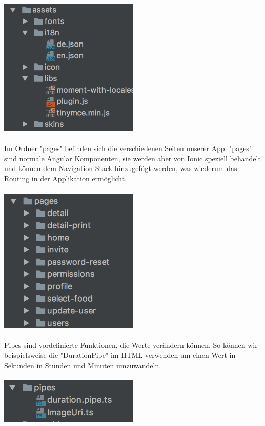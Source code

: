 \documentclass[11pt]{article} %
\begin{document}
\\
\includegraphics[width=0.5\textwidth]{ionic/src-assets}
\\
\\
Im Ordner "pages" befinden sich die verschiedenen Seiten unserer App. "pages" sind normale Angular Komponenten, sie werden aber von Ionic speziell behandelt und können dem Navigation Stack hinzugefügt werden, was wiederum das Routing in der Applikation ermöglicht.
\\
\\
\includegraphics[width=0.5\textwidth]{ionic/src-pages}
\\
\\
Pipes sind vordefinierte Funktionen, die Werte verändern können. So können wir beispielsweise die "DurationPipe" im HTML verwenden um einen Wert in Sekunden in Stunden und Minuten umzuwandeln.
\\
\\
\includegraphics[width=0.5\textwidth]{ionic/src-pipes}
\\
\end{document}
